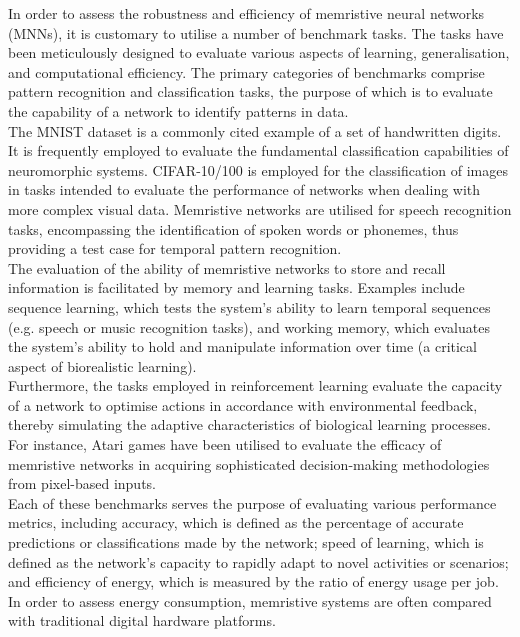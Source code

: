\noindent In order to assess the robustness and efficiency of memristive neural networks (MNNs), it is customary to utilise a number of benchmark tasks. The tasks have been meticulously designed to evaluate various aspects of learning, generalisation, and computational efficiency. The primary categories of benchmarks comprise pattern recognition and classification tasks, the purpose of which is to evaluate the capability of a network to identify patterns in data. \\

\noindent The MNIST dataset is a commonly cited example of a set of handwritten digits. It is frequently employed to evaluate the fundamental classification capabilities of neuromorphic systems. CIFAR-10/100 is employed for the classification of images in tasks intended to evaluate the performance of networks when dealing with more complex visual data. Memristive networks are utilised for speech recognition tasks, encompassing the identification of spoken words or phonemes, thus providing a test case for temporal pattern recognition.\\

\noindent The evaluation of the ability of memristive networks to store and recall information is facilitated by memory and learning tasks. Examples include sequence learning, which tests the system's ability to learn temporal sequences (e.g. speech or music recognition tasks), and working memory, which evaluates the system's ability to hold and manipulate information over time (a critical aspect of biorealistic learning). \\

\noindent Furthermore, the tasks employed in reinforcement learning evaluate the capacity of a network to optimise actions in accordance with environmental feedback, thereby simulating the adaptive characteristics of biological learning processes. For instance, Atari games have been utilised to evaluate the efficacy of memristive networks in acquiring sophisticated decision-making methodologies from pixel-based inputs. \\

\noindent Each of these benchmarks serves the purpose of evaluating various performance metrics, including accuracy, which is defined as the percentage of accurate predictions or classifications made by the network; speed of learning, which is defined as the network's capacity to rapidly adapt to novel activities or scenarios; and efficiency of energy, which is measured by the ratio of energy usage per job. In order to assess energy consumption, memristive systems are often compared with traditional digital hardware platforms.\\

